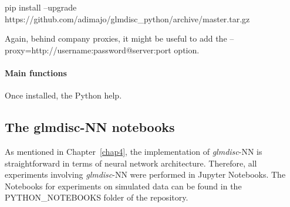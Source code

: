 pip install --upgrade https://github.com/adimajo/glmdisc\_python/archive/master.tar.gz

Again, behind company proxies, it might be useful to add the --proxy=http://username:password@server:port option.

\paragraph{Main functions}

Once installed, the Python help.

\subsection{The glmdisc-NN notebooks}

As mentioned in Chapter~\ref{chap4}, the implementation of \textit{glmdisc}-NN is straightforward in terms of neural network architecture. Therefore, all experiments involving \textit{glmdisc}-NN were performed in Jupyter Notebooks. The Notebooks for experiments on simulated data can be found in the PYTHON\_NOTEBOOKS folder of the repository.
